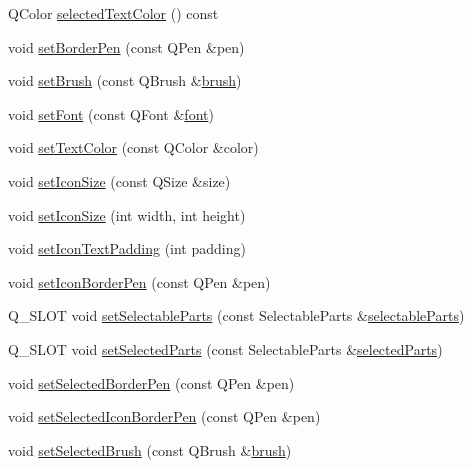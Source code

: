 \begin{DoxyCompactItemize}
Q\+Color \mbox{\hyperlink{class_q_c_p_legend_ab9b469b27787bfb2ce6c8978a31821af}{selected\+Text\+Color}} () const
\item 
void \mbox{\hyperlink{class_q_c_p_legend_a866a9e3f5267de7430a6c7f26a61db9f}{set\+Border\+Pen}} (const Q\+Pen \&pen)
\item 
void \mbox{\hyperlink{class_q_c_p_legend_a497bbcd38baa3598c08e2b3f48103f23}{set\+Brush}} (const Q\+Brush \&\mbox{\hyperlink{class_q_c_p_legend_aaddafd5cbe9175512311350bb3b563e6}{brush}})
\item 
void \mbox{\hyperlink{class_q_c_p_legend_aa4cda8499e3cb0f3be415edc02984c73}{set\+Font}} (const Q\+Font \&\mbox{\hyperlink{class_q_c_p_legend_ae240104de3c3a4cfc0834dbaffa07ac9}{font}})
\item 
void \mbox{\hyperlink{class_q_c_p_legend_ae1eb239ff4a4632fe1b6c3e668d845c6}{set\+Text\+Color}} (const Q\+Color \&color)
\item 
void \mbox{\hyperlink{class_q_c_p_legend_a8b0740cce488bf7010da6beda6898984}{set\+Icon\+Size}} (const Q\+Size \&size)
\item 
void \mbox{\hyperlink{class_q_c_p_legend_a96b1a37fd4ee6a9778e6e54fe56ab6c2}{set\+Icon\+Size}} (int width, int height)
\item 
void \mbox{\hyperlink{class_q_c_p_legend_a62973bd69d5155e8ea3141366e8968f6}{set\+Icon\+Text\+Padding}} (int padding)
\item 
void \mbox{\hyperlink{class_q_c_p_legend_a2f2c93d18a651f4ff294bb3f026f49b8}{set\+Icon\+Border\+Pen}} (const Q\+Pen \&pen)
\item 
Q\+\_\+\+S\+L\+OT void \mbox{\hyperlink{class_q_c_p_legend_a9ce60aa8bbd89f62ae4fa83ac6c60110}{set\+Selectable\+Parts}} (const Selectable\+Parts \&\mbox{\hyperlink{class_q_c_p_legend_ad091ff5e11edbe0adecba81c35522ac7}{selectable\+Parts}})
\item 
Q\+\_\+\+S\+L\+OT void \mbox{\hyperlink{class_q_c_p_legend_a2aee309bb5c2a794b1987f3fc97f8ad8}{set\+Selected\+Parts}} (const Selectable\+Parts \&\mbox{\hyperlink{class_q_c_p_legend_a3efbf879f6936ec337690985e567dc6f}{selected\+Parts}})
\item 
void \mbox{\hyperlink{class_q_c_p_legend_a2c35d262953a25d96b6112653fbefc88}{set\+Selected\+Border\+Pen}} (const Q\+Pen \&pen)
\item 
void \mbox{\hyperlink{class_q_c_p_legend_ade93aabe9bcccaf9cf46cec22c658027}{set\+Selected\+Icon\+Border\+Pen}} (const Q\+Pen \&pen)
\item 
void \mbox{\hyperlink{class_q_c_p_legend_a875227f3219c9799464631dec5e8f1bd}{set\+Selected\+Brush}} (const Q\+Brush \&\mbox{\hyperlink{class_q_c_p_legend_aaddafd5cbe9175512311350bb3b563e6}{brush}})

\end{DoxyCompactItemize}
